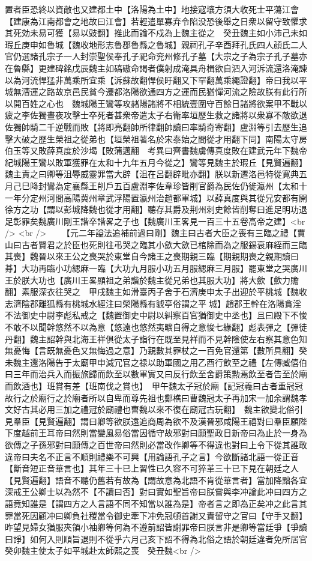 置者臣恐終以資敵也又建都土中【洛陽為土中】地接寇壤方須大收死士平蕩江會【建康為江南都會之地故曰江會】若輕遣單寡弃令陷没恐後舉之日衆以留守致懼求其死効未易可獲【易以豉翻】推此而論不戍為上魏主從之　癸丑魏主如小沛己未如瑕丘庚申如魯城【魏收地形志魯郡魯縣之魯城】親祠孔子辛酉拜孔氏四人顔氏二人官仍選諸孔宗子一人封崇聖侯奉孔子祀命兖州修孔子墓【大宗之子為宗子孔子墓亦在魯縣】更建碑銘戊辰魏主如碻磝命謁者僕射成淹具舟楫欲自泗入河泝流還洛淹諫以為河流悍猛非萬乘所宜乘【泝蘇故翻悍侯盱翻又下罕翻萬乘繩證翻】帝曰我以平城無漕運之路故京邑民貧今遷都洛陽欲通四方之運而民猶憚河流之險故朕有此行所以開百姓之心也　魏城陽王鸞等攻赭陽諸將不相統壹圍守百餘日諸將欲案甲不戰以疲之李佐獨晝夜攻擊士卒死者甚衆帝遣太子右衛率垣歷生救之諸將以衆寡不敵欲退佐獨帥騎二千逆戰而敗【將即亮翻帥所律翻帥讀曰率騎奇寄翻】盧淵等引去歷生追擊大破之歷生榮祖之從弟也【垣榮祖著名於宋泰始之間從才用翻下同】南陽太守房伯玉等又敗薛真度於沙堨【敗蒲邁翻　考異曰齊書魏虜傳真度敗在建武元年下魏帝紀城陽王鸞以敗軍獲罪在太和十九年五月今從之】鸞等見魏主於瑕丘【見賢遍翻】魏主責之曰卿等沮辱威靈罪當大辟【沮在呂翻辟毗亦翻】朕以新遷洛邑特從寛典五月己巳降封鸞為定襄縣王削戶五百盧淵李佐韋珍皆削官爵為民佐仍徙瀛州【太和十一年分定州河間高陽冀州章武浮陽置瀛州治趙都軍城】以薛真度與其從兄安都有開徐方之功【謂以彭城降魏也從才用翻】聽存其爵及荆州刺史餘皆削奪曰進足明功退足彰罪矣魏廣川剛王諧卒諧畧之子也【魏廣川王畧見一百三十五卷高帝之建】<br />
<br />
　　【元二年謚法追補前過曰剛】魏主曰古者大臣之喪有三臨之禮【賈山曰古者賢君之於臣也死則往弔哭之臨其小歛大歛已棺除而為之服錫衰麻絰而三臨其喪】魏晉以來王公之喪哭於東堂自今諸王之喪期親三臨【期親期喪之親期讀曰朞】大功再臨小功緦麻一臨【大功九月服小功五月服緦麻三月服】罷東堂之哭廣川王於朕大功也【廣川王畧顯祖之弟諧於魏主從兄弟也其服大功】將大歛【歛力贍翻】素服深衣往哭之　甲戌魏主如滑臺丙子舍于石濟庚申太子出迎於平桃城【魏收志濟陰郡離狐縣有桃城水經注曰榮陽縣有䝞亭俗謂之平城】趙郡王幹在洛陽貪淫不法御史中尉李彪私戒之【魏置御史中尉以糾察百官猶御史中丞也】且曰殿下不悛不敢不以聞幹悠然不以為意【悠遠也悠然夷曠自得之意悛七緣翻】彪表彈之【彈徒丹翻】魏主詔幹與北海王祥俱從太子詣行在既至見祥而不見幹陰使左右察其意色知無憂悔【言既無憂色又無悔過之意】乃親數其罪杖之一百免官還第【數所具翻】癸未魏主還洛陽告于太廟甲申減冗官之禄以助軍國之用乙酉行飲至之禮【左傳臧僖伯曰三年而治兵入而振旅歸而飲至以數軍實又曰反行飲至舍爵策勲焉飲至者告至於廟而飲酒也】班賞有差【班南伐之賞也】　甲午魏太子冠於廟【記冠義曰古者重冠冠故行之於廟行之於廟者所以自卑而尊先祖也鄭樵曰曹魏冠太子再加宋一加余謂魏孝文好古其必用三加之禮冠於廟禮也曹魏以來不復在廟冠古玩翻】　魏主欲變北俗引見羣臣【見賢遍翻】謂曰卿等欲朕遠追商周為欲不及漢晉邪咸陽王禧對曰羣臣願陛下度越前王耳帝曰然則當變風易俗當因循守故邪對曰願聖政日新帝曰為止於一身為欲傳之子孫邪對曰願傳之百世帝曰然則必當改作卿等不得違也對曰上令下從其誰敢違帝曰夫名不正言不順則禮樂不可興【用論語孔子之言】今欲斷諸北語一從正音【斷音短正音華言也】其年三十已上習性已久容不可猝革三十已下見在朝廷之人【見賢遍翻】語音不聽仍舊若有故為【謂故意為北語不肯從華言者】當加降黜各宜深戒王公卿士以為然不【不讀曰否】對曰實如聖旨帝曰朕嘗與李冲論此冲曰四方之語竟知誰是【謂四方之人言語不同不知當以誰為是】帝者言之即為正矣冲之此言其罪當死因顧冲曰卿負社稷當令御史牽下冲免冠頓首謝又責留守之官曰【守手又翻】昨望見婦女猶服夾領小袖卿等何為不遵前詔皆謝罪帝曰朕言非是卿等當廷爭【爭讀曰諍】如何入則順旨退則不從乎六月己亥下詔不得為北俗之語於朝廷違者免所居官癸卯魏主使太子如平城赴太師熙之喪　癸丑魏<br />

